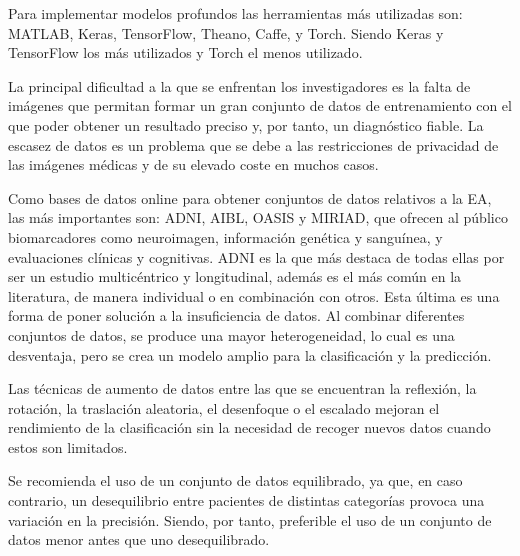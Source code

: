 Para implementar modelos profundos las herramientas más utilizadas son: MATLAB, Keras, TensorFlow, Theano, Caffe, y
Torch.
Siendo Keras y TensorFlow los más utilizados y Torch el menos utilizado.

La principal dificultad a la que se enfrentan los investigadores es la falta de imágenes que permitan formar un gran
conjunto de datos de entrenamiento con el que poder obtener un resultado preciso y, por tanto, un diagnóstico fiable.
La escasez de datos es un problema que se debe a las restricciones de privacidad de las imágenes médicas y de su elevado
coste en muchos casos.

Como bases de datos online para obtener conjuntos de datos relativos a la EA, las más importantes son: ADNI, AIBL,
OASIS y MIRIAD, que ofrecen al público biomarcadores como neuroimagen, información genética y sanguínea, y evaluaciones
clínicas y cognitivas.
ADNI es la que más destaca de todas ellas por ser un estudio multicéntrico y longitudinal, además es el más común en la
literatura, de manera individual o en combinación con otros.
Esta última es una forma de poner solución a la insuficiencia de datos.
Al combinar diferentes conjuntos de datos, se produce una mayor heterogeneidad, lo cual es una desventaja, pero se crea
un modelo amplio para la clasificación y la predicción.

Las técnicas de aumento de datos entre las que se encuentran la reflexión, la rotación, la traslación aleatoria, el
desenfoque o el escalado mejoran el rendimiento de la clasificación sin la necesidad de recoger nuevos datos cuando
estos son limitados.

Se recomienda el uso de un conjunto de datos equilibrado, ya que, en caso contrario, un desequilibrio entre pacientes de
distintas categorías provoca una variación en la precisión.
Siendo, por tanto, preferible el uso de un conjunto de datos menor antes que uno desequilibrado.

%
%
%